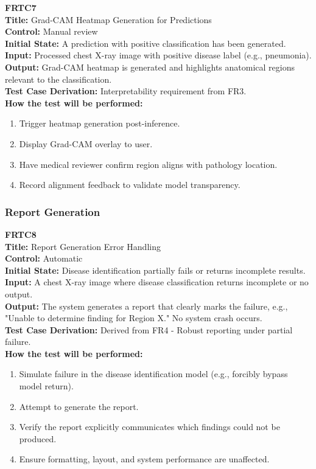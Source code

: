 \documentclass[12pt, titlepage]{article}
\begin{document}
\vspace{1em}

\textbf{FRTC7}\\
\textbf{Title:} Grad-CAM Heatmap Generation for Predictions\\
\textbf{Control:} Manual review\\
\textbf{Initial State:} A prediction with positive classification has been generated.\\
\textbf{Input:} Processed chest X-ray image with positive disease label (e.g., pneumonia).\\
\textbf{Output:} Grad-CAM heatmap is generated and highlights anatomical regions relevant to the classification.\\
\textbf{Test Case Derivation:} Interpretability requirement from FR3.\\
\textbf{How the test will be performed:}
\begin{enumerate}
  \item Trigger heatmap generation post-inference.
  \item Display Grad-CAM overlay to user.
  \item Have medical reviewer confirm region aligns with pathology location.
  \item Record alignment feedback to validate model transparency.
\end{enumerate}

\vspace{1em}

\subsubsection{Report Generation}

\textbf{FRTC8}\\
\textbf{Title:} Report Generation Error Handling\\
\textbf{Control:} Automatic\\
\textbf{Initial State:} Disease identification partially fails or returns incomplete results.\\
\textbf{Input:} A chest X-ray image where disease classification returns incomplete or no output.\\
\textbf{Output:} The system generates a report that clearly marks the failure, e.g., "Unable to determine finding for Region X." No system crash occurs.\\
\textbf{Test Case Derivation:} Derived from FR4 - Robust reporting under partial failure.\\
\textbf{How the test will be performed:}
\begin{enumerate}
  \item Simulate failure in the disease identification model (e.g., forcibly bypass model return).
  \item Attempt to generate the report.
  \item Verify the report explicitly communicates which findings could not be produced.
  \item Ensure formatting, layout, and system performance are unaffected.
\end{enumerate}
\end{document}
